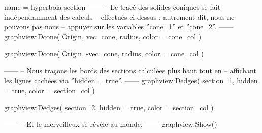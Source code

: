 \documentclass{standalone}
\begin{document}
\begin{luadraw}{name = hyperbola-section}
------
-- Le tracé des solides coniques se fait indépendamment des calculs
-- effectués ci-dessus : autrement dit, nous ne pouvons pas nous
-- appuyer sur les variables ''cone_1'' et ''cone_2''.
------
graphview:Dcone(
  Origin, vec_cone, radius,
  {
    color = cone_col
  })

graphview:Dcone(
  Origin, -vec_cone, radius,
  {
    color = cone_col
  })

------
-- Nous traçons les bords des sections calculées plus haut tout en
-- affichant les lignes cachées via ''hidden = true''.
------
graphview:Dedges(
  section_1,
  {
    hidden = true,
    color = section_col
  })

graphview:Dedges(
  section_2,
  {
    hidden = true,
    color = section_col
  })

------
-- Et le merveilleux se révèle au monde.
------
graphview:Show()
\end{luadraw}
\end{document}
